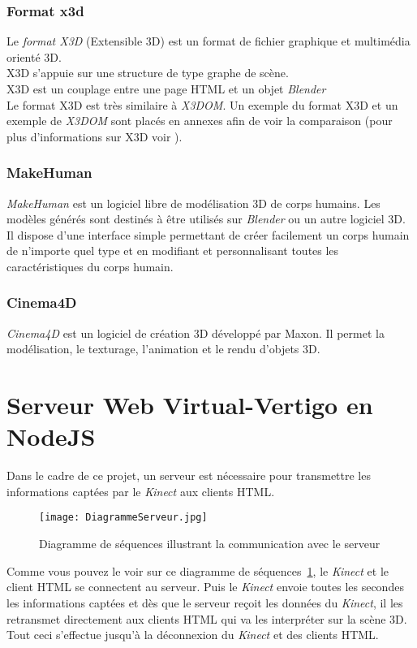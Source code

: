 \subsubsection{Format x3d} \label{x3d}
Le \textit{format X3D} (Extensible 3D) est un format de fichier graphique et multimédia orienté 3D.\\
X3D s'appuie sur une structure de type graphe de scène. \\
X3D est un couplage entre une page HTML et un objet \textit{Blender} \\
Le format X3D est très similaire à \textit{X3DOM}. Un exemple du format X3D et un exemple de \textit{X3DOM} sont placés en annexes afin de voir la comparaison (pour plus d'informations sur X3D voir \cite{X3D}).

\subsubsection{MakeHuman}
\textit{MakeHuman} est un logiciel libre de modélisation 3D de corps humains. Les modèles générés sont destinés à être utilisés sur \textit{Blender} ou un autre logiciel 3D. \\

Il dispose d'une interface simple permettant de créer facilement un corps humain de n'importe quel type et en modifiant et personnalisant toutes les caractéristiques du corps humain.

\subsubsection{Cinema4D}
\textit{Cinema4D} est un logiciel de création 3D développé par \textsf{Maxon}. Il permet la modélisation, le texturage, l'animation et le rendu d'objets 3D.


\pagebreak 
\section{Serveur Web Virtual-Vertigo en NodeJS}  \label{serveur}
Dans le cadre de ce projet, un serveur est nécessaire pour transmettre les informations captées par le \textit{Kinect} aux clients HTML. \\

\begin{figure}[H]
	\centering
		\texttt{[image: DiagrammeServeur.jpg]}
	\caption{\label{DiagrammeServeur} Diagramme de séquences illustrant la communication avec le serveur}
\end{figure}
Comme vous pouvez le voir sur ce diagramme de séquences~\ref{DiagrammeServeur}, le \textit{Kinect} et le client HTML se connectent au serveur. Puis le \textit{Kinect} envoie toutes les secondes les informations captées et dès que le serveur reçoit les données du \textit{Kinect}, il les retransmet directement aux clients HTML qui va les interpréter sur la scène 3D. Tout ceci s'effectue jusqu'à la déconnexion du \textit{Kinect} et des clients HTML.\\

